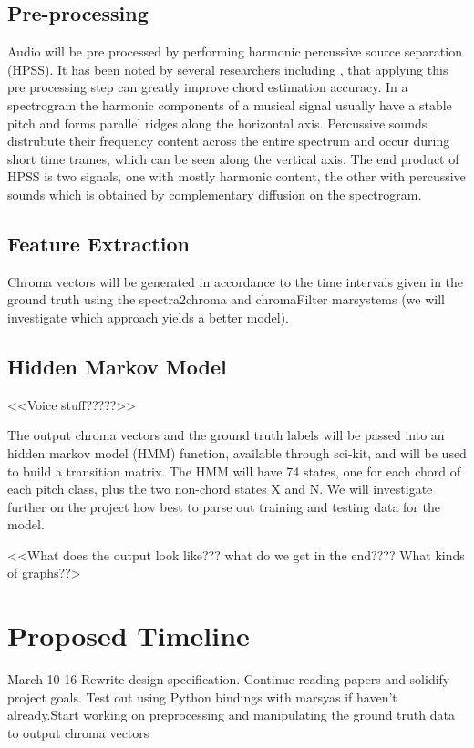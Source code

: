 \documentclass{article}
\begin{document}
\subsection{Pre-processing}
Audio will be pre processed by performing harmonic percussive source separation
(HPSS). It has been noted by several researchers including \cite{Reed:09}, that
applying this pre processing step can greatly improve chord estimation
accuracy. In a spectrogram the harmonic components of a musical signal usually
have a stable pitch and forms parallel ridges along the horizontal axis.
Percussive sounds distrubute their frequency content across the entire spectrum
and occur during short time trames, which can be seen along the vertical axis.
The end product of HPSS is two signals, one with mostly harmonic content, the
other with percussive sounds which is obtained by complementary diffusion on
the spectrogram.


\subsection{Feature Extraction}

Chroma vectors will be generated in accordance to the time intervals given in
the ground truth using the spectra2chroma and chromaFilter marsystems (we will
investigate which approach yields a better model).

\subsection{Hidden Markov Model}

<<Voice stuff?????>>

The output chroma vectors and the ground truth labels will be passed into an
hidden markov model (HMM) function, available through sci-kit, and will be used
to build a transition matrix. The HMM will have 74 states, one for each chord
of each pitch class, plus the two non-chord states X and N. We will investigate
further on the project how best to parse out training and testing data for the
model.

<<What does the output look like??? what do we get in the end???? What kinds of
graphs??>

\section{Proposed Timeline}\label{sec:timeline}

March 10-16\newline
Rewrite design specification. Continue reading papers and solidify project
goals. Test out using Python bindings with marsyas if haven't already.Start
working on preprocessing and manipulating the ground truth data to output
chroma vectors\newline
\newline
\end{document}
